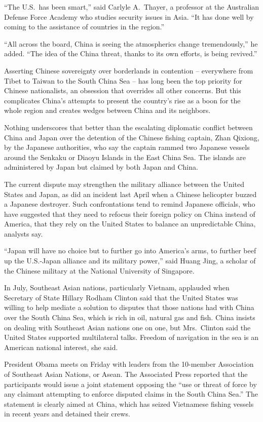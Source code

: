 ﻿\documentclass[12pt]{article}
\begin{document}
``The U.S.~has been smart,'' said Carlyle A.~Thayer, a professor at the Australian Defense Force
Academy who studies security issues in Asia. ``It has done well by coming to the assistance of
countries in the region.''

``All across the board, China is seeing the atmospherics change tremendously,'' he added. ``The idea
of the China threat, thanks to its own efforts, is being revived.''

Asserting Chinese sovereignty over borderlands in contention -- everywhere from Tibet to Taiwan to
the South China Sea -- has long been the top priority for Chinese nationalists, an obsession that
overrides all other concerns. But this complicates China's attempts to present the country's rise as
a boon for the whole region and creates wedges between China and its neighbors.

Nothing underscores that better than the escalating diplomatic conflict between China and Japan over
the detention of the Chinese fishing captain, Zhan Qixiong, by the Japanese authorities, who say the
captain rammed two Japanese vessels around the Senkaku or Diaoyu Islands in the East China Sea. The
islands are administered by Japan but claimed by both Japan and China.

The current dispute may strengthen the military alliance between the United States and Japan, as did
an incident last April when a Chinese helicopter buzzed a Japanese destroyer. Such confrontations
tend to remind Japanese officials, who have suggested that they need to refocus their foreign policy
on China instead of America, that they rely on the United States to balance an unpredictable China,
analysts say.

``Japan will have no choice but to further go into America's arms, to further beef up the U.S.-Japan
alliance and its military power,'' said Huang Jing, a scholar of the Chinese military at the
National University of Singapore.

In July, Southeast Asian nations, particularly Vietnam, applauded when Secretary of State Hillary
Rodham Clinton said that the United States was willing to help mediate a solution to disputes that
those nations had with China over the South China Sea, which is rich in oil, natural gas and fish.
China insists on dealing with Southeast Asian nations one on one, but Mrs.~Clinton said the United
States supported multilateral talks. Freedom of navigation in the sea is an American national
interest, she said.

President Obama meets on Friday with leaders from the 10-member Association of Southeast Asian
Nations, or Asean. The Associated Press reported that the participants would issue a joint statement
opposing the ``use or threat of force by any claimant attempting to enforce disputed claims in the
South China Sea.'' The statement is clearly aimed at China, which has seized Vietnamese fishing
vessels in recent years and detained their crews.
\end{document}
